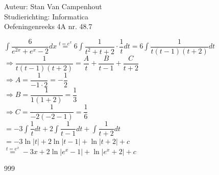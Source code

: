 \documentclass[a4paper]{article}
\begin{document}
  
\noindent \large Auteur: Stan Van Campenhout \\
\noindent \large Studierichting:  Informatica\\
\noindent \large Oefeningenreeks 4A nr. 48.7\\

\medskip

\normalsize

$ \displaystyle\int\dfrac{6}{e^{2x}+e^x-2}dx \stackrel{t = e^x}{=} 6\displaystyle\int\dfrac{1}{t^2+t+2}\cdot\dfrac{1}{t}dt 
= 6\displaystyle\int\dfrac{1}{t\left(t-1\right)\left(t+2\right)}dt  $\\

$ \Rightarrow \dfrac{1}{t\left(t-1\right)\left(t+2\right)} = \dfrac{A}{t} + \dfrac{B}{t-1} + \dfrac{C}{t+2} $\\

$ \Rightarrow A = \dfrac{1}{-1\cdot2} = -\dfrac{1}{2} $\\

$ \Rightarrow B = \dfrac{1}{1\left(1+2\right)} = \dfrac{1}{3} $\\

$ \Rightarrow C = \dfrac{1}{-2\left(-2-1\right)} = \dfrac{1}{6} $\\

$ = -3\displaystyle\int\dfrac{1}{t}dt + 2\displaystyle\int\dfrac{1}{t-1}dt + \displaystyle\int\dfrac{1}{t+2}dt $\\

$ = -3\ln|t| + 2\ln|t-1| + \ln|t+2| + c $\\

$ \stackrel{t = e^x}{=} -3x + 2\ln|e^x-1| + \ln|e^x+2| + c $\\

\begin{thebibliography}{999}
\end{thebibliography}
\end{document}
